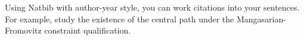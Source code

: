 \documentclass[runningheads,orivec,oribibl]{llncs}
\begin{document}
Using Natbib with author-year style, you can work citations into your sentences.
For example, \cite{wright-orban-2002} study the existence of the central path under the Mangasarian-Fromovitz constraint qualification.












\newpage

\hypertarget{contents}{}  %
\tableofcontents
\listoftodos
\end{document}
